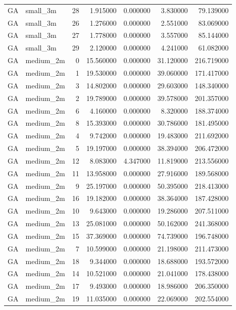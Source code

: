 \begin{tabular}{llrrrrr}
GA & small_3m & 28 & 1.915000 & 0.000000 & 3.830000 & 79.139000 \\
GA & small_3m & 26 & 1.276000 & 0.000000 & 2.551000 & 83.069000 \\
GA & small_3m & 27 & 1.778000 & 0.000000 & 3.557000 & 85.144000 \\
GA & small_3m & 29 & 2.120000 & 0.000000 & 4.241000 & 61.082000 \\
GA & medium_2m & 0 & 15.560000 & 0.000000 & 31.120000 & 216.719000 \\
GA & medium_2m & 1 & 19.530000 & 0.000000 & 39.060000 & 171.417000 \\
GA & medium_2m & 3 & 14.802000 & 0.000000 & 29.603000 & 148.340000 \\
GA & medium_2m & 2 & 19.789000 & 0.000000 & 39.578000 & 201.357000 \\
GA & medium_2m & 6 & 4.160000 & 0.000000 & 8.320000 & 188.374000 \\
GA & medium_2m & 8 & 15.393000 & 0.000000 & 30.786000 & 181.495000 \\
GA & medium_2m & 4 & 9.742000 & 0.000000 & 19.483000 & 211.692000 \\
GA & medium_2m & 5 & 19.197000 & 0.000000 & 38.394000 & 206.472000 \\
GA & medium_2m & 12 & 8.083000 & 4.347000 & 11.819000 & 213.556000 \\
GA & medium_2m & 11 & 13.958000 & 0.000000 & 27.916000 & 189.568000 \\
GA & medium_2m & 9 & 25.197000 & 0.000000 & 50.395000 & 218.413000 \\
GA & medium_2m & 16 & 19.182000 & 0.000000 & 38.364000 & 187.428000 \\
GA & medium_2m & 10 & 9.643000 & 0.000000 & 19.286000 & 207.511000 \\
GA & medium_2m & 13 & 25.081000 & 0.000000 & 50.162000 & 241.368000 \\
GA & medium_2m & 15 & 37.369000 & 0.000000 & 74.739000 & 196.748000 \\
GA & medium_2m & 7 & 10.599000 & 0.000000 & 21.198000 & 211.473000 \\
GA & medium_2m & 18 & 9.344000 & 0.000000 & 18.688000 & 193.572000 \\
GA & medium_2m & 14 & 10.521000 & 0.000000 & 21.041000 & 178.438000 \\
GA & medium_2m & 17 & 9.493000 & 0.000000 & 18.986000 & 206.350000 \\
GA & medium_2m & 19 & 11.035000 & 0.000000 & 22.069000 & 202.554000 \\

\end{tabular}
